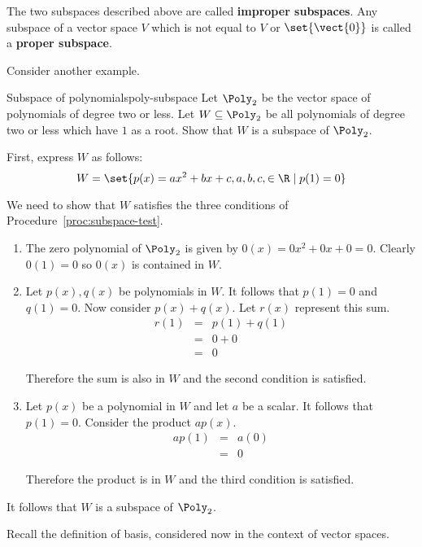The two subspaces described above are called \textbf{improper subspaces}. Any subspace of a vector space $V$ which is not equal to $V$ or  $\set{\vect{0} }$ is called a \textbf{proper subspace}.

Consider another example.

\begin{example}{Subspace of polynomials}{poly-subspace}
Let $\Poly_2$ be the vector space of polynomials of degree two or less. Let $W \subseteq \Poly_2$ be all polynomials of degree two or less which have $1$ as a root. Show that $W$ is a subspace of $\Poly_2$.
\end{example}

\begin{solution}
First, express $W$ as follows:
\[
W = \set{p(x) = ax^2 +bx +c, a,b,c, \in \R \mid p(1)  = 0 }
\]

We need to show that $W$ satisfies the three conditions of Procedure~\ref{proc:subspace-test}.
\begin{enumerate}
\item
The zero polynomial of $\Poly_2$ is given by $0(x) = 0x^2 + 0x + 0 = 0$. Clearly $0(1) = 0$ so $0(x)$ is contained in $W$.

\item
Let $p(x), q(x)$ be polynomials in $W$.  It follows that $p(1) = 0 $ and $q(1) = 0$. Now consider $p(x) + q(x)$. Let $r(x)$ represent this sum.
\begin{eqnarray*}
r(1) &=& p(1) + q(1) \\
&=& 0 + 0 \\
&=& 0
\end{eqnarray*}

Therefore the sum is also in $W$ and the second condition is satisfied.

\item
Let $p(x)$ be a polynomial in $W$ and let $a$ be a scalar. It follows that $p(1) = 0$. Consider the product $ap(x)$.
\begin{eqnarray*}
ap(1) &=& a(0) \\
&=& 0
\end{eqnarray*}

Therefore the product is in $W$ and the third condition is satisfied.
\end{enumerate}

It follows that $W$ is a subspace of $\Poly_2$.
\end{solution}

Recall the definition of basis, considered now in the context of vector spaces.

